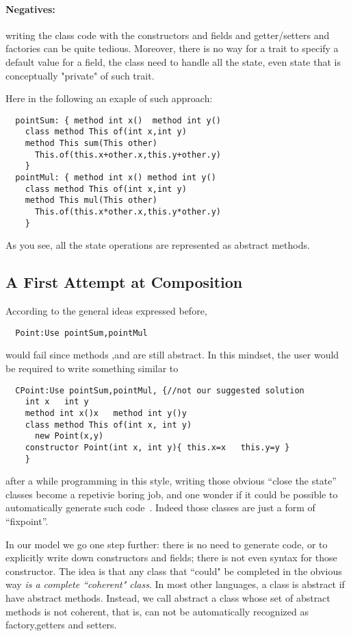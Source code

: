 \paragraph*{Negatives:} writing the class code with the constructors and
   fields and getter/setters and factories can be quite tedious.
   Moreover, there is no way for a trait to specify a default value for a field,
   the class need to handle all the state, even state that is conceptually
   "private" of such trait.

Here in the following an exaple of such approach:

\begin{lstlisting}
  pointSum: { method int x()  method int y()
    class method This of(int x,int y)
    method This sum(This other)
      This.of(this.x+other.x,this.y+other.y)
    }
  pointMul: { method int x() method int y()
    class method This of(int x,int y)
    method This mul(This other)
      This.of(this.x*other.x,this.y*other.y)
    }
\end{lstlisting}

As you see, all the state operations are represented as abstract methods.

\subsection{A First Attempt at Composition}
According to the general ideas expressed before,
\begin{lstlisting}
  Point:Use pointSum,pointMul
\end{lstlisting}  

\noindent would fail since methods \Q@x@,\Q@y@ and \Q@of@ are still abstract.
In this mindset, the user would be required to write something similar to

\begin{lstlisting}
  CPoint:Use pointSum,pointMul, {//not our suggested solution
    int x   int y
    method int x()x   method int y()y
    class method This of(int x, int y)
      new Point(x,y)
    constructor Point(int x, int y){ this.x=x   this.y=y }
    }
\end{lstlisting}

\noindent after a while programming in this style, 
writing those obvious ``close the state'' classes become a
repetivie boring job, and one wonder
if it could be possible to automatically generate such code~\cite{wang2016classless}.
Indeed those classes are just a form of ``fixpoint''.

In our model we go one step further: there is no need to generate code, or to explicitly
write down constructors and fields; there is not even syntax for those
constructor.
The idea is that any class that ``could" be completed in the obvious way
\emph{is a complete ``coherent" class}.
In most other languages, a class is abstract if have abstract methods.
Instead, we call abstract a class whose set of abstract methods is not
coherent, that is, can not be automatically recognized as factory,getters and setters.
  
